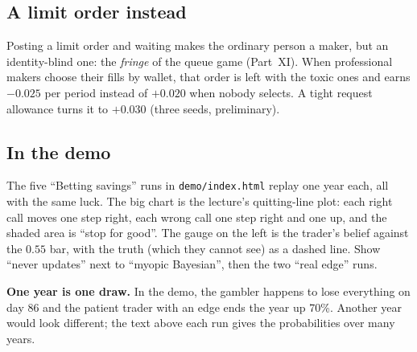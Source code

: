 \documentclass[11pt]{article}
\begin{document}
\subsection{A limit order instead}
Posting a limit order and waiting makes the ordinary person a maker, but an identity-blind one: the
\emph{fringe} of the queue game (Part~XI). When professional makers choose their fills by wallet, that
order is left with the toxic ones and earns $-0.025$ per period instead of $+0.020$ when nobody selects.
A tight request allowance turns it to $+0.030$ (three seeds, preliminary).

\subsection{In the demo}
The five ``Betting savings'' runs in \texttt{demo/index.html} replay one year each, all with the same luck.
The big chart is the lecture's quitting-line plot: each right call moves one step right, each wrong call
one step right and one up, and the shaded area is ``stop for good''. The gauge on the left is the
trader's belief against the $0.55$ bar, with the truth (which they cannot see) as a dashed line. Show
``never updates'' next to ``myopic Bayesian'', then the two ``real edge'' runs.
\begin{warning}
\textbf{One year is one draw.} In the demo, the gambler happens to lose everything on day 86 and the
patient trader with an edge ends the year up 70\%. Another year would look different; the text above each
run gives the probabilities over many years.
\end{warning}

\end{document}
